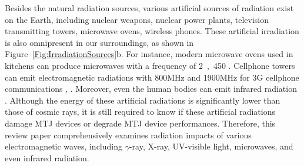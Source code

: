 \documentclass[molecules,review,submit,pdftex,moreauthors]{Definitions/mdpi}
\begin{document}
Besides the natural radiation sources, various artificial sources of radiation exist on the Earth, including nuclear weapons, nuclear power plants, television transmitting towers, microwave ovens, wireless phones.  These artificial irradiation is also omnipresent in our surroundings, as shown in Figure~\ref{Fig:IrradiationSources}b.  For instance, modern microwave ovens used in kitchens can produce microwaves with a frequency of \unit{2,450}{\mega\hertz} .  Cellphone towers can emit electromagnetic radiations with \unit{800}{MHz} and \unit{1900}{MHz} for 3G cellphone communications , .  Moreover, even the human bodies can emit infrared radiation .  Although the energy of these artificial radiations is significantly lower than those of cosmic rays, it is still required to know if these artificial radiations damage MTJ devices or degrade MTJ device performances. Therefore, this review paper comprehensively examines radiation impacts of various electromagnetic waves, including $\gamma$-ray, X-ray, UV-visible light, microwaves, and even infrared radiation.


\end{document}
